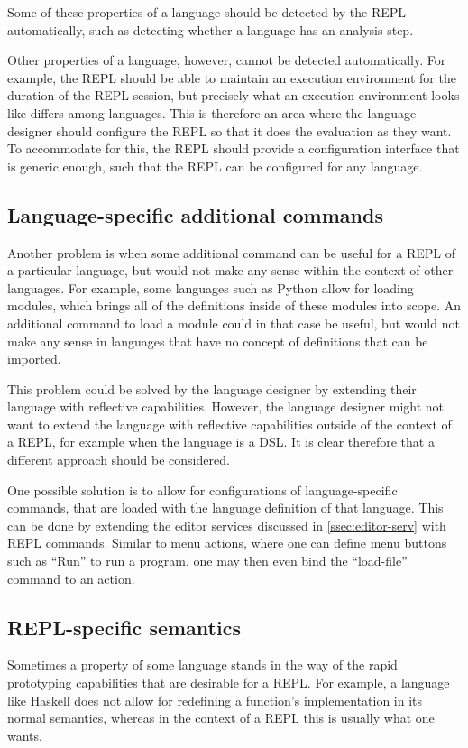 Some of these properties of a language should be detected by the REPL
automatically, such as detecting whether a language has an analysis
step.

Other properties of a language, however, cannot be detected
automatically. For example, the REPL should be able to maintain an
execution environment for the duration of the REPL session, but
precisely what an execution environment looks like differs among
languages. This is therefore an area where the language designer
should configure the REPL so that it does the evaluation as they
want. To accommodate for this, the REPL should provide a configuration
interface that is generic enough, such that the REPL can be configured
for any language.

\subsection{Language-specific additional commands}
\label{sec:lang-spec-addit}
Another problem is when some additional command can be useful for a
REPL of a particular language, but would not make any sense within the
context of other languages. For example, some languages such as Python
allow for loading modules, which brings all of the definitions inside
of these modules into scope. An additional command to load a module
could in that case be useful, but would not make any sense in
languages that have no concept of definitions that can be imported.

This problem could be solved by the language designer by extending
their language with reflective capabilities. However, the language
designer might not want to extend the language with reflective
capabilities outside of the context of a REPL, for example when the
language is a DSL. It is clear therefore that a different approach
should be considered.

One possible solution is to allow for configurations of
language-specific commands, that are loaded with the language
definition of that language. This can be done by extending the editor
services discussed in \cref{ssec:editor-serv} with REPL
commands. Similar to menu actions, where one can define menu buttons
such as ``Run'' to run a program, one may then even bind the
``load-file'' command to an action.

\subsection{REPL-specific semantics}
\label{sec:repl-spec-semant}
Sometimes a property of some language stands in the way of the rapid
prototyping capabilities that are desirable for a REPL. For example, a
language like Haskell does not allow for redefining a function's
implementation in its normal semantics, whereas in the context of a
REPL this is usually what one wants.

